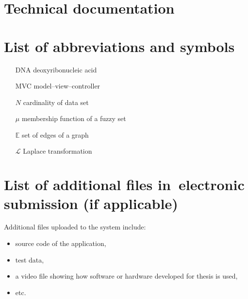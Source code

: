 \documentclass[a4paper,twoside,12pt]{book}
\begin{document}
\backmatter

\printbibliography           %

\begin{appendices}

\chapter{Technical documentation}


\chapter{List of abbreviations and symbols}

\begin{itemize}
\item[DNA] deoxyribonucleic acid
\item[MVC] model--view--controller
\item[$N$] cardinality of data set
\item[$\mu$] membership function of a fuzzy set
\item[$\mathbb{E}$] set of edges of a graph
\item[$\mathcal{L}$] Laplace transformation
\end{itemize}

\chapter{List of additional files in~electronic submission (if applicable)}

Additional files uploaded to the system include:
\begin{itemize}
\item source code of the application,
\item test data,
\item a video file showing how software or hardware developed for thesis is used,
\item etc.
\end{itemize}



\listoffigures
{}
\listoftables
{}

\end{appendices}
\end{document}
